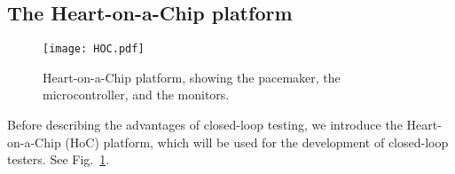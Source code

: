 \subsection{The Heart-on-a-Chip platform}
\label{HoC}

\begin{figure}[!t]
	\centering
	\texttt{[image: HOC.pdf]}		
	\caption{\small Heart-on-a-Chip platform, showing the pacemaker, the microcontroller, and the monitors.}
	\label{fig:hoc}
\end{figure} 

Before describing the advantages of closed-loop testing, we introduce the Heart-on-a-Chip (HoC) platform, which will be used for the development of closed-loop testers.
See Fig.~\ref{fig:hoc}.
